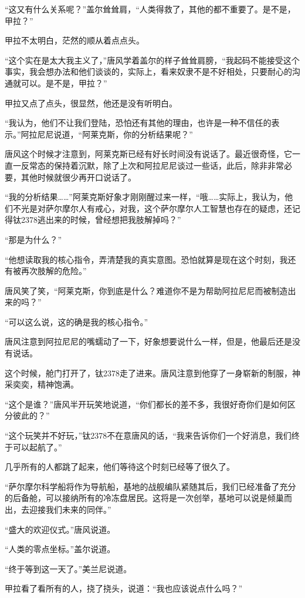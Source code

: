 “这又有什么关系呢？”盖尔耸耸肩，“人类得救了，其他的都不重要了。是不是，甲拉？” 

甲拉不太明白，茫然的顺从着点点头。 

“这个实在是太大我主义了，”唐风学着盖尔的样子耸耸肩膀，“我起码不能接受这个事实，我会想办法和他们谈谈的，实际上，看来奴隶不是不好相处，只要耐心的沟通就可以。是不是，甲拉？” 

甲拉又点了点头，很显然，他还是没有听明白。 

“我认为，他们不让我们登陆，恐怕还有其他的理由，也许是一种不信任的表示。”阿拉尼尼说道，“阿莱克斯，你的分析结果呢？” 

唐风这个时候才注意到，阿莱克斯已经有好长时间没有说话了。最近很奇怪，它一直一反常态的保持着沉默，除了上次和阿拉尼尼谈过一些话，此后，除非非常必要，其他时候就很少再开口说话了。 

“我的分析结果……”阿莱克斯好象才刚刚醒过来一样，“哦……实际上，我认为，他们不光是对萨尔摩尔人有戒心，对我，这个萨尔摩尔人工智慧也存在的疑虑，还记得钛2378逃出来的时候，曾经想把我肢解掉吗？” 

“那是为什么？” 

“他想读取我的核心指令，弄清楚我的真实意图。恐怕就算是现在这个时刻，我还有被再次肢解的危险。” 

唐风笑了笑，“阿莱克斯，你到底是什么？难道你不是为帮助阿拉尼尼而被制造出来的吗？” 

“可以这么说，这的确是我的核心指令。” 

唐风注意到阿拉尼尼的嘴蠕动了一下，好象想要说什么一样，但是，他最后还是没有说话。 

这个时候，舱门打开了，钛2378走了进来。唐风注意到他穿了一身崭新的制服，神采奕奕，精神饱满。 

“这个是谁？”唐风半开玩笑地说道，“你们都长的差不多，我很好奇你们是如何区分彼此的？” 

“这个玩笑并不好玩，”钛2378不在意唐风的话，“我来告诉你们一个好消息，我们终于可以起航了。” 

几乎所有的人都跳了起来，他们等待这个时刻已经等了很久了。 

“萨尔摩尔科学船将作为导航船，基地的战舰编队紧随其后，我们已经准备了充分的后备舱，可以接纳所有的冷冻盘居民。这将是一次创举，基地可以说是倾巢而出，去迎接我们未来的同伴。” 

“盛大的欢迎仪式。”唐风说道。 

“人类的零点坐标。”盖尔说道。 

“终于等到这一天了。”美兰尼说道。 

甲拉看了看所有的人，挠了挠头，说道：“我也应该说点什么吗？” 

